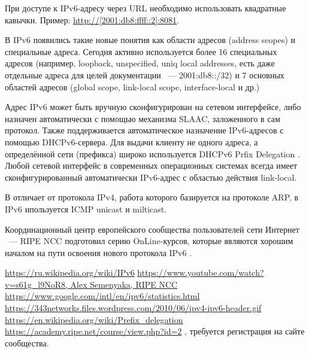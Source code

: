 \documentclass[10pt, a5paper]{article}
\begin{document}
При доступе к IPv6-адресу через URL необходимо использовать квадратные кавычки. Пример: \url{ http://[2001:db8:ffff::2]:8081}.

В IPv6 появились такие новые понятия как области адресов (address scopes) и специальные адреса. Сегодня активно используется более 16 специальных адресов (например, loopback, unspecified, uniq local addresses, есть даже отдельные адреса для целей документации ~--- 2001:db8::/32) и 7 основных областей адресов (global scope, link-local scope, interface-local и др.)

Адрес IPv6 может быть вручную сконфигурирован на сетевом интерфейсе, либо назначен автоматически с помощью механизма SLAAC, заложенного в сам протокол. Также поддерживается автоматическое назначение IPv6-адресов с помощью DHCPv6-сервера. Для выдачи клиенту не одного адреса, а определённой сети (префикса) широко используется DHCPv6 Prfix Delegation \cite{Semernik-4}. Любой сетевой интерфейс в современных операционных системах всегда имеет сконфигурированный автоматически IPv6-адрес с областью действия link-local.

В отличает от протокола IPv4, работа которого базируется на протоколе ARP, в IPv6 ипользуется ICMP unicast и milticast.

Координационный центр европейского сообщества пользователей сети Интернет ~--- RIPE NCC подготовил серию OnLine-курсов, которые являются хорошим началом на пути освоения нового протокола IPv6 \cite{Semernik-5}.

\begin{thebibliography}{20}
\url{https://ru.wikipedia.org/wiki/IPv6}
\url{https://www.youtube.com/watch?v=s61g\_l9NoR8, Alex Semenyaka, RIPE NCC}
\url{https://www.google.com/intl/en/ipv6/statistics.html}
\url{https://343networks.files.wordpress.com/2010/06/ipv4-ipv6-header.gif}
\url{https://en.wikipedia.org/wiki/Prefix\_delegation}
\url{https://academy.ripe.net/course/view.php?id=2} , требуется регистрация на сайте сообщества.
\end{thebibliography}
\end{document}
